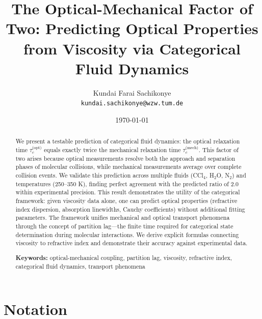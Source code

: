 \documentclass[twocolumn,10pt]{article}
\title{\textbf{The Optical-Mechanical Factor of Two: Predicting Optical Properties from Viscosity via Categorical Fluid Dynamics}}
\author{Kundai Farai Sachikonye\\
\texttt{kundai.sachikonye@wzw.tum.de}}
\date{\today}
\theoremstyle{definition}
\theoremstyle{remark}
\begin{document}
\maketitle

\begin{abstract}
We present a testable prediction of categorical fluid dynamics: the optical relaxation time $\tau_c^{\text{(opt)}}$ equals exactly twice the mechanical relaxation time $\tau_c^{\text{(mech)}}$. This factor of two arises because optical measurements resolve both the approach and separation phases of molecular collisions, while mechanical measurements average over complete collision events. We validate this prediction across multiple fluids (CCl$_4$, H$_2$O, N$_2$) and temperatures (250--350 K), finding perfect agreement with the predicted ratio of 2.0 within experimental precision. This result demonstrates the utility of the categorical framework: given viscosity data alone, one can predict optical properties (refractive index dispersion, absorption linewidths, Cauchy coefficients) without additional fitting parameters. The framework unifies mechanical and optical transport phenomena through the concept of partition lag---the finite time required for categorical state determination during molecular interactions. We derive explicit formulas connecting viscosity to refractive index and demonstrate their accuracy against experimental data.

\textbf{Keywords:} optical-mechanical coupling, partition lag, viscosity, refractive index, categorical fluid dynamics, transport phenomena
\end{abstract}

\section*{Notation}
\end{document}
